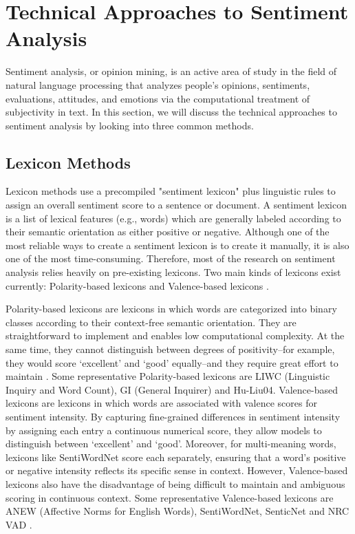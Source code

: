 \documentclass{xum_review}
\begin{document}
\section{Technical Approaches to Sentiment Analysis}
Sentiment analysis, or opinion mining, is an active area of study in the field
of natural language processing that analyzes people's opinions, sentiments,
evaluations, attitudes, and emotions via the computational treatment of
subjectivity in text. In this section, we will discuss the technical approaches
to sentiment analysis by looking into three common methods.

\subsection{Lexicon Methods}

Lexicon methods use a precompiled "sentiment lexicon" plus linguistic rules to
assign an overall sentiment score to a sentence or document. A sentiment lexicon
is a list of lexical features (e.g., words) which are generally labeled
according to their semantic orientation as either positive or negative. Although
one of the most reliable ways to create a sentiment lexicon is to create it
manually, it is also one of the most time-consuming. Therefore, most of the
research on sentiment analysis relies heavily on pre-existing lexicons. Two main
kinds of lexicons exist currently: Polarity-based lexicons  and Valence-based
lexicons \citep{hutto2014vader}.

Polarity-based lexicons are lexicons in which words are categorized into binary
classes according to their context-free semantic orientation. They are
straightforward to implement and enables low computational complexity. At the
same time, they cannot distinguish between degrees of positivity--for example,
they would score `excellent' and `good' equally--and they require great effort to
maintain \citep{tripathi2016survey}. Some representative Polarity-based
lexicons are LIWC (Linguistic Inquiry and Word Count), GI (General Inquirer) and
Hu-Liu04. Valence-based lexicons are lexicons in which words are associated with
valence scores for sentiment intensity. By capturing fine-grained differences in
sentiment intensity by assigning each entry a continuous numerical score, they
allow models to distinguish between `excellent' and `good'. Moreover, for
multi-meaning words, lexicons like SentiWordNet score each separately, ensuring
that a word's positive or negative intensity reflects its specific sense in
context. However, Valence-based lexicons also have the disadvantage of being
difficult to maintain \citep{yadollahi2018current} and ambiguous scoring in
continuous context. Some representative Valence-based lexicons are
ANEW (Affective Norms for English Words), SentiWordNet, SenticNet and NRC
VAD \citep{mohammad2018obtaining}. 
\end{document}
